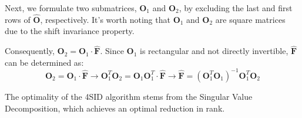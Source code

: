 \begin{enumerate}
        Next, we formulate two submatrices, $\mathbf{O}_1$ and $\mathbf{O}_2$, by excluding the last and first rows of $\hat{\mathbf{O}}$, respectively. 
        It's worth noting that $\mathbf{O}_1$ and $\mathbf{O}_2$ are square matrices due to the shift invariance property.
        
        Consequently, $\mathbf{O}_2=\mathbf{O}_1\cdot \hat{\mathbf{F}}$.
        Since $\mathbf{O}_1$ is rectangular and not directly invertible, $\hat{\mathbf{F}}$ can be determined as:
        \[\mathbf{O}_2=\mathbf{O}_1\cdot \hat{\mathbf{F}} \rightarrow \mathbf{O}_1^T\mathbf{O}_2=\mathbf{O}_1\mathbf{O}_1^T\cdot \hat{\mathbf{F}} \rightarrow \hat{\mathbf{F}}=\left(\mathbf{O}_1^T\mathbf{O}_1\right)^{-1}\mathbf{O}_1^T\mathbf{O}_2\]
\end{enumerate}
\begin{property}
    The optimality of the 4SID algorithm stems from the Singular Value Decomposition, which achieves an optimal reduction in rank.
\end{property}